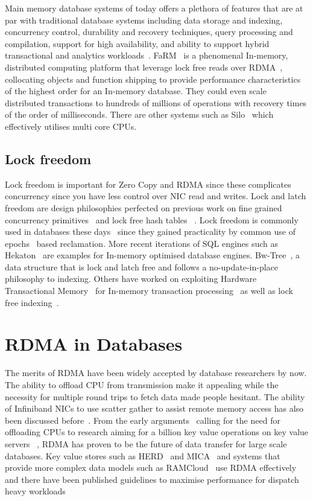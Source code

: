 Main memory database systems of today offers a plethora of features that are at par with traditional
database systems including data storage and indexing, concurrency control, durability and 
recovery techniques, query processing and compilation, support for high availability, and 
ability to support hybrid transactional and analytics workloads~\cite{mmdbmstutorial}.
FaRM~\cite{farm} is a phenomenal In-memory, distributed computing platform that leverage lock free reads over RDMA~\cite{rdma},
collocating objects and function shipping to provide performance characteristics of the 
highest order for an In-memory database. They could even scale distributed transactions to
hundreds of millions of operations with recovery times of the order of milliseconds. There 
are other systems such as Silo~\cite{silo} which effectively utilises multi core CPUs.

\subsection{Lock freedom}
Lock freedom is important for Zero Copy and RDMA since these complicates concurrency since
you have less control over NIC read and writes. Lock and latch freedom are 
design philosophies perfected on previous work on fine grained concurrency 
primitives~\cite{finegrained} and lock free hash tables ~\cite{lockfreeht}. Lock freedom is commonly
used in databases these days~\cite{htm} since they gained practicality by common use of
epochs~\cite{lockfreedom} based reclamation. 
More recent iterations of SQL engines such as Hekaton~\cite{hekaton} are 
examples for In-memory optimised  database engines. Bw-Tree~\cite{bw-tree}, a 
data structure that is lock and latch free and follows a no-update-in-place philosophy to indexing.
Others have worked on exploiting Hardware Transactional Memory~\cite{htm-old}
for In-memory transaction processing~\cite{drtm} as well as lock free indexing~\cite{htm}.

\section{RDMA in Databases}
The merits of RDMA have been widely accepted by database researchers by now. The 
ability to offload CPU from transmission make it appealing while the necessity for 
multiple round trips to fetch data made people hesitant. The ability of Infiniband NICs to 
use scatter gather to assist remote memory access has also been discussed before~\cite{zerocopy04}.
From the early arguments~\cite{rdmacase} calling for the need for offloading CPUs to 
research aiming for a billion key value operations on key value servers ~\cite{rdmabillion},
RDMA has proven to be the future of data transfer for large scale databases. Key value stores
such as HERD~\cite{herd} and MICA~\cite{mica} and systems that provide more complex
data models such as RAMCloud~\cite{ramcloud} use RDMA effectively and there have been 
published guidelines to maximise performance for dispatch heavy workloads~\cite{rdma}

